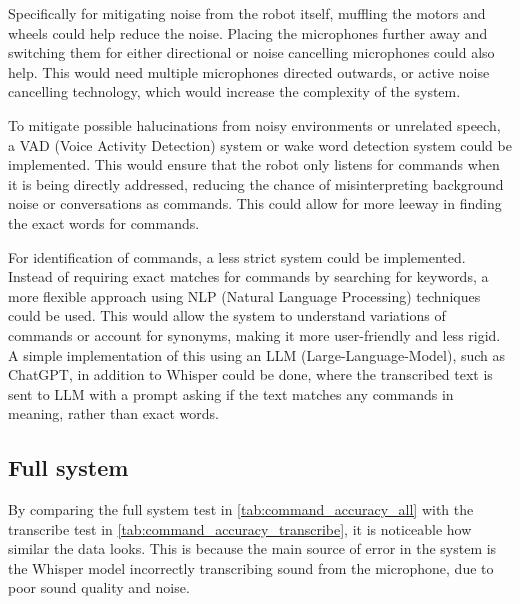 Specifically for mitigating noise from the robot itself, muffling the motors and wheels could help reduce the noise. Placing the microphones further away and switching them for either directional or noise cancelling microphones could also help. This would need multiple microphones directed outwards, or active noise cancelling technology, which would increase the complexity of the system.

To mitigate possible halucinations from noisy environments or unrelated speech, a VAD (Voice Activity Detection) system \cite{ciscopress_articles} or wake word detection system could be implemented. This would ensure that the robot only listens for commands when it is being directly addressed, reducing the chance of misinterpreting background noise or conversations as commands. This could allow for more leeway in finding the exact words for commands.

For identification of commands, a less strict system could be implemented. Instead of requiring exact matches for commands by searching for keywords, a more flexible approach using NLP (Natural Language Processing) techniques could be used.\cite{eisenstein2019introduction} This would allow the system to understand variations of commands or account for synonyms, making it more user-friendly and less rigid. A simple implementation of this using an LLM (Large-Language-Model), such as ChatGPT, in addition to Whisper could be done, where the transcribed text is sent to LLM with a prompt asking if the text matches any commands in meaning, rather than exact words.


\subsection{Full system}
By comparing the full system test in \cref{tab:command_accuracy_all} with the transcribe test in \cref{tab:command_accuracy_transcribe}, it is noticeable how similar the data looks. This is because the main source of error in the system is the Whisper model incorrectly transcribing sound from the microphone, due to poor sound quality and noise.

